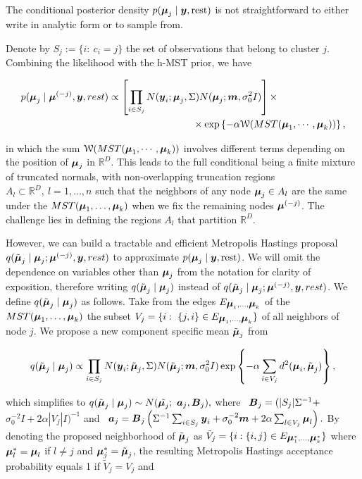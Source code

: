 \begin{enumerate}
The conditional posterior density $p(\mbox{\boldmath $\mu$}_j\mid \mbox{\boldmath $y$}, \mbox{rest})$ is not straightforward to either write in analytic form or to sample from. 

Denote by $S_j:=\{i: \ c_i=j\}$ the set of observations that belong to cluster $j$. Combining the likelihood with the h-MST prior, we have

\begin{align*}
p(\bfmu_j \mid \bfmu^{(-j)}, \bfy, rest)&\propto \left[\prod_{i\in S_j} N(\bfy_i; \bfmu_{j}, \Sigma) N(\bfmu_j; \bfm, \sigma^2_0I)\right]\times \\
& \hspace{3 cm}\times\exp\left\{-\alpha\mathcal{W}( MST(\bfmu_1, \cdots, \bfmu_k) ) \right\},
\end{align*}

\noindent in which the sum $\mathcal{W}( MST(\mbox{\boldmath $\mu$}_1, \cdots, \mbox{\boldmath $\mu$}_k) )$ involves different terms depending on the position of $\mbox{\boldmath $\mu$}_j$ in $\mathbb{R}^D$. This leads to the full conditional being a finite mixture of truncated normals, with non-overlapping truncation regions $A_l\subset \mathbb{R}^D, \ l=1, \ldots, n$ such that the neighbors of any node $\mbox{\boldmath $\mu$}_j\in A_l$ are the same under the $MST(\mbox{\boldmath $\mu$}_1, \ldots, \mbox{\boldmath $\mu$}_k)$ when we fix the remaining nodes $\mbox{\boldmath $\mu$}^{(-j)}$. The challenge lies in defining the regions $A_l$ that partition $\mathbb{R}^D$.

However, we can build a tractable and efficient Metropolis Hastings proposal $q(\tilde{\mbox{\boldmath $\mu$}}_j \mid \mbox{\boldmath $\mu$}_j; \mbox{\boldmath $\mu$}^{(-j)}, \mbox{\boldmath $y$}, rest)$ to approximate $p(\mbox{\boldmath $\mu$}_j\mid \mbox{\boldmath $y$}, \mbox{rest})$. We will omit the dependence on variables other than $\mbox{\boldmath $\mu$}_j$ from the notation for clarity of exposition, therefore writing $q(\tilde{\mbox{\boldmath $\mu$}}_j \mid \mbox{\boldmath $\mu$}_j)$ instead of $q(\tilde{\mbox{\boldmath $\mu$}}_j \mid \mbox{\boldmath $\mu$}_j; \mbox{\boldmath $\mu$}^{(-j)}, \mbox{\boldmath $y$}, rest)$. We define $q(\tilde{\mbox{\boldmath $\mu$}}_j \mid \mbox{\boldmath $\mu$}_j)$ as follows. Take from the edges $E_{\mbox{\boldmath $\mu$}_1, \ldots, \mbox{\boldmath $\mu$}_k}$ of the $MST(\mbox{\boldmath $\mu$}_1, \ldots, \mbox{\boldmath $\mu$}_k)$  the subset $V_j=\{i: \ \{j,i\} \in E_{\bfmu_1, \ldots, \bfmu_k} \}$ of all neighbors of node $j$. We propose a new component specific mean $\tilde{\mbox{\boldmath $\mu$}}_j$ from


\begin{align*}
q(\tilde{\mbox{\boldmath $\mu$}}_j \mid \mbox{\boldmath $\mu$}_j)\propto \prod_{i\in S_j} N(\mbox{\boldmath $y$}_i; \tilde{\mbox{\boldmath $\mu$}}_{j}, \Sigma) N(\tilde{\mbox{\boldmath $\mu$}}_j; \mbox{\boldmath $m$}, \sigma^2_0I) \exp\left\{-\alpha\sum_{i \in V_j} d^2(\mbox{\boldmath $\mu$}_i, \tilde{\mbox{\boldmath $\mu$}}_j) \right\},
\end{align*}

\noindent which simplifies to $q(\tilde{\mbox{\boldmath $\mu$}}_j \mid \mbox{\boldmath $\mu$}_j)\sim N(\tilde{\mbox{\boldmath $\mu$}_j}; \ \mbox{\boldmath $a$}_j, \mbox{\boldmath $B$}_j),$ where \ $\mbox{\boldmath $B$}_j = ( |S_j| \Sigma^{-1} +$ $\sigma^{-2}_0 I + 2\alpha |V_j|I )^{-1}$ and \ $\mbox{\boldmath $a$}_j = \mbox{\boldmath $B$}_j\left( \Sigma^{-1} \sum_{i \in S_j}\mbox{\boldmath $y$}_i + \sigma^{-2}_0\mbox{\boldmath $m$} + 2\alpha\sum_{l \in V_j}\mbox{\boldmath $\mu$}_l\right).$ By denoting the proposed neighborhood of $\tilde{\mbox{\boldmath $\mu$}}_j$ as $\tilde{V}_j=\{i: \{i,j\} \in E_{\mbox{\boldmath $\mu$}^*_1, \ldots, \mbox{\boldmath $\mu$}^*_k}\}$ where $\mbox{\boldmath $\mu$}^*_l = \mbox{\boldmath $\mu$}_l$ if $l\neq j$ and $\mbox{\boldmath $\mu$}^*_j = \tilde{\mbox{\boldmath $\mu$}}_j$, the resulting Metropolis Hastings acceptance probability equals 1 if $\tilde{V}_j = V_j$ and


\end{enumerate}
